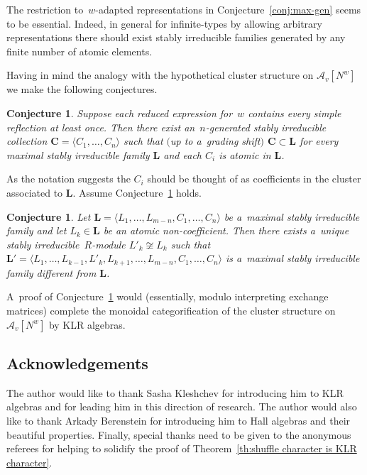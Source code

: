 \documentclass[pdftex]{sigma}
\numberwithin{equation}{section}
\newtheorem{Conjecture}[Theorem]{Conjecture}
\begin{document}
\begin{Remark}
The restriction to~$w$-adapted representations in Conjecture~\ref{conj:max-gen} seems to be essential.
Indeed, in general for inf\/inite-types by allowing arbitrary representations there should exist stably irreducible
families generated by any f\/inite number of atomic elements.
\end{Remark}

Having in mind the analogy with the hypothetical cluster structure on $\mathcal{A}_v[N^w]$ we make the following conjectures.
\begin{Conjecture}
\label{conj:coefficients}
Suppose each reduced expression for~$w$ contains every simple ref\/lection at least once.
Then there exist an~$n$-generated stably irreducible collection $\mathbf{C}=\langle C_1,\ldots,C_n\rangle$ such that $($up
to a~grading shift$)$ $\mathbf{C}\subset\mathbf{L}$ for every maximal stably irreducible family $\mathbf{L}$ and each
$C_i$ is atomic in $\mathbf{L}$.
\end{Conjecture}

As the notation suggests the $C_i$ should be thought of as coef\/f\/icients in the cluster associated to $\mathbf{L}$.
Assume Conjecture~\ref{conj:coefficients} holds.
\begin{Conjecture}
\label{conj:mutations}
Let $\mathbf{L}=\langle L_1,\ldots,L_{m-n},C_1,\ldots,C_n\rangle$ be a~maximal stably irreducible family and let
$L_k\in\mathbf{L}$ be an atomic non-coefficient.
Then there exists a~unique stably irreducible~$R$-module $L'_k\not\cong L_k$ such that $\mathbf{L}'=\langle
L_1,\ldots,L_{k-1},L'_k,L_{k+1},\ldots,L_{m-n},C_1,\ldots,C_n\rangle$ is a~maximal stably irreducible family different from $\mathbf{L}$.
\end{Conjecture}
A~proof of Conjecture~\ref{conj:mutations} would (essentially, modulo interpreting exchange matrices) complete the
monoidal categorif\/ication of the cluster structure on $\mathcal{A}_v[N^w]$ by KLR algebras.

\subsection*{Acknowledgements}
The author would like to thank Sasha Kleshchev for introducing him to KLR algebras and for leading him in this direction of research.
The author would also like to thank Arkady Berenstein for introducing him to Hall algebras and their beautiful properties.
Finally, special thanks need to be given to the anonymous referees for helping to solidify the proof of
Theorem~\ref{th:shuffle character is KLR character}.
\end{document}
